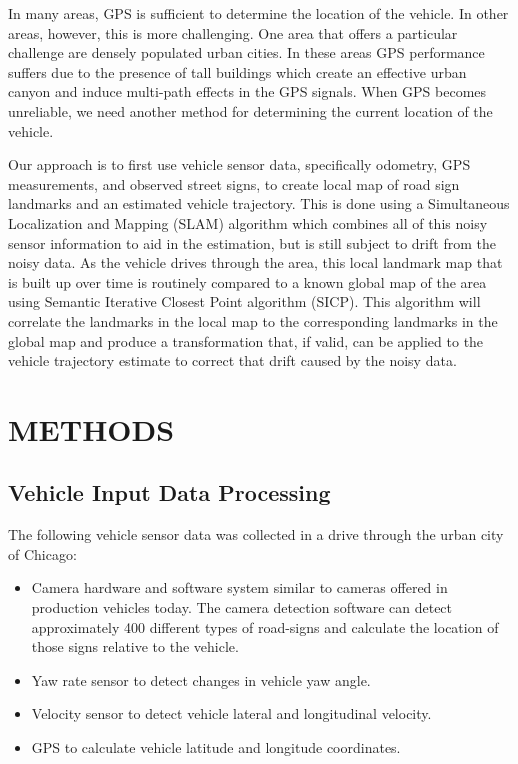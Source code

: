 \documentclass[letterpaper, 10 pt, conference]{ieeeconf}  %
\begin{document}
In many areas, GPS is sufficient to determine the location of the vehicle. In other areas, however, this is more challenging. One area that offers a particular challenge are densely populated urban cities. In these areas GPS performance suffers due to the presence of tall buildings which create an effective urban canyon and induce multi-path effects in the GPS signals. When GPS becomes unreliable, we need another method for determining the current location of the vehicle.

Our approach is to first use vehicle sensor data, specifically odometry, GPS measurements, and observed street signs, to create local map of road sign landmarks and an estimated vehicle trajectory. This is done using a Simultaneous Localization and Mapping (SLAM) algorithm which combines all of this noisy sensor information to aid in the estimation, but is still subject to drift from the noisy data. As the vehicle drives through the area, this local landmark map that is built up over time is routinely compared to a known global map of the area using Semantic Iterative Closest Point algorithm (SICP). This algorithm will correlate the landmarks in the local map to the corresponding landmarks in the global map and produce a transformation that, if valid, can be applied to the vehicle trajectory estimate to correct that drift caused by the noisy data.

\section{METHODS}

\subsection{Vehicle Input Data Processing}

The following vehicle sensor data was collected in a drive through the urban city of Chicago:
\begin{itemize}
\item Camera hardware and software system similar to cameras offered in production vehicles today. The camera detection software can detect approximately 400 different types of road-signs and calculate the location of those signs relative to the vehicle. 
\item Yaw rate sensor to detect changes in vehicle yaw angle.
\item Velocity sensor to detect vehicle lateral and longitudinal velocity.
\item GPS to calculate vehicle latitude and longitude coordinates.
\end{itemize}
\end{document}
